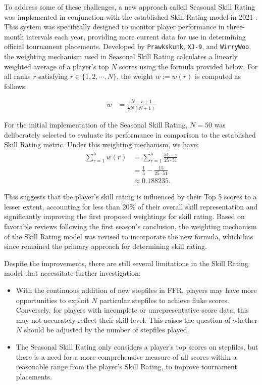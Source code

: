 \vspace{2mm}

To address some of these challenges, a new approach called Seasonal Skill Rating was implemented in conjunction with the established Skill Rating model in 2021 \cite{20211001}. This system was specifically designed to monitor player performance in three-month intervals each year, providing more current data for use in determining official tournament placements. Developed by \texttt{Prawkskunk}, \texttt{XJ-9}, and \texttt{WirryWoo}, the weighting mechanism used in Seasonal Skill Rating calculates a linearly weighted average of a player's top $N$ scores using the formula provided below. For all ranks $r$ satisfying $r \in \{1, 2, \cdots, N\}$, the weight $w := w(r)$ is computed as follows:

\begin{align*}
	w & = \frac{N - r + 1}{\frac{1}{2}N (N + 1)} 
\end{align*}


For the initial implementation of the Seasonal Skill Rating, $N = 50$ was deliberately selected to evaluate its performance in comparison to the established Skill Rating metric. Under this weighting mechanism, we have:
\begin{align*}
	\sum_{r = 1}^5 w(r) & = \displaystyle \sum_{r = 1}^5 \frac{51 - r}{25 \cdot 51} \\
  &= \frac{1}{5} - \frac{15}{25 \cdot 51}\\
  &\approx 0.188235.
\end{align*}

This suggests that the player's skill rating is influenced by their Top 5 scores to a lesser extent, accounting for less than 20\% of their overall skill representation and significantly improving the first proposed weightings for skill rating. Based on favorable reviews following the first season's conclusion, the weighting mechanism of the Skill Rating model was revised to incorporate the new formula, which has since remained the primary approach for determining skill rating.
\vspace{2mm}

Despite the improvements, there are still several limitations in the Skill Rating model that necessitate further investigation: 
\begin{itemize}
	\item With the continuous addition of new stepfiles in FFR, players may have more opportunities to exploit $N$ particular stepfiles to achieve fluke scores. Conversely, for players with incomplete or unrepresentative score data, this may not accurately reflect their skill level. This raises the question of whether $N$ should be adjusted by the number of stepfiles played.
	\item The Seasonal Skill Rating only considers a player's top scores on stepfiles, but there is a need for a more comprehensive measure of all scores within a reasonable range from the player's Skill Rating, to improve tournament placements.
	      
\end{itemize}

